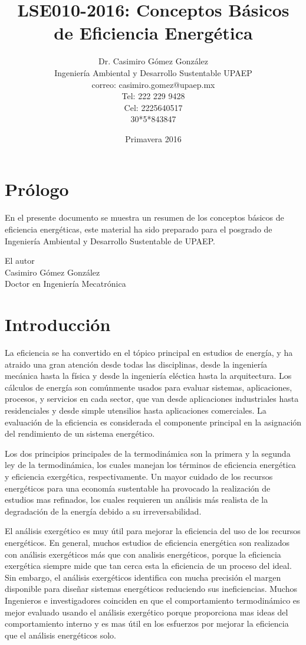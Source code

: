 \documentclass[12pt, twoside]{report}
\title{LSE010-2016: Conceptos Básicos de Eficiencia Energética}
\author{Dr. Casimiro Gómez González\\
Ingeniería Ambiental y Desarrollo Sustentable UPAEP\\
               correo: casimiro.gomez@upaep.mx\\
               Tel: 222 229 9428 \\
               Cel: 2225640517 \\
                     30*5*843847}
\date{Primavera 2016}
\begin{document}
\maketitle

\chapter*{Prólogo}

En el presente documento se muestra un resumen de los conceptos básicos de eficiencia energéticas, este material ha sido preparado para el posgrado de Ingeniería Ambiental y Desarrollo Sustentable de UPAEP.


\begin{flushright}
	
	El autor\\
	Casimiro Gómez González\\
	Doctor en Ingeniería Mecatrónica
\end{flushright}

\tableofcontents


\chapter{Introducción}

La eficiencia se ha convertido en el tópico principal en estudios de energía, y ha atraido una gran atención desde todas las disciplinas, desde la ingeniería mecánica hasta la física y desde la ingeniería eléctica hasta la arquitectura. Los cálculos de energía son comúnmente usados para evaluar sistemas, aplicaciones, procesos, y servicios en cada sector, que van desde aplicaciones industriales hasta residenciales y desde simple utensilios hasta aplicaciones comerciales. La evaluación de la eficiencia es considerada el componente principal en la asignación del rendimiento de un sistema energético.

Los dos principios principales de la termodinámica son la primera y la segunda ley de la termodinámica, los cuales manejan los términos de eficiencia energética y eficiencia exergética, respectivamente. Un mayor cuidado de los recursos energéticos para una economía sustentable ha provocado la realización de estudios mas refinados, los cuales requieren un análisis más realista de la degradación de la energía debido a su irreversabilidad.

El análisis exergético es muy útil para mejorar la eficiencia del uso de los recursos energéticos. En general, muchos estudios de eficiencia energética son realizados con análisis exergéticos más que con analisis energéticos, porque la eficiencia exergética siempre mide que tan cerca esta la eficiencia de un proceso del ideal. Sin embargo, el análisis exergéticos identifica con mucha precisión el margen disponible para diseñar sistemas energéticos reduciendo sus ineficiencias. Muchos Ingenieros e investigadores coinciden en que el comportamiento termodinámico es mejor evaluado usando el análisis exergético porque proporciona mas ideas del comportamiento interno y es mas útil en los esfuerzos por mejorar la eficiencia que el análisis energéticos solo.
\end{document}
